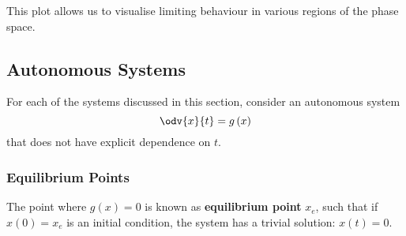 \documentclass{article}
\begin{document}
This plot allows us to visualise limiting behaviour in various regions of the
phase space.
\subsection{Autonomous Systems}
For each of the systems discussed in this section, consider an autonomous system
\begin{equation*}
    \odv{x}{t} = g\left( x \right)
\end{equation*}
that does not have explicit dependence on \(t\).
\subsubsection{Equilibrium Points}
The point where \(g\left( x \right) = 0\) is known as \textbf{equilibrium point} \(x_e\), such that if \(x\left( 0 \right) = x_e\) is an initial condition, the system has a trivial solution: \(x\left( t \right) = 0\).
\end{document}

